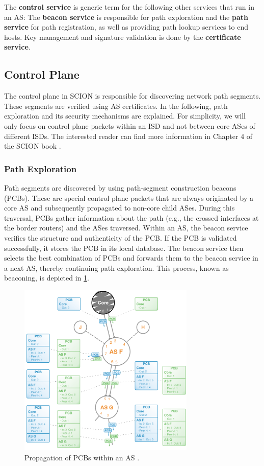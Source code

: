 The \textbf{control service} is generic term for the following other services that run in an AS:
The \textbf{beacon service} is responsible for path exploration and the \textbf{path service} for path registration, as well as providing path lookup services to end hosts.
Key management and signature validation is done by the \textbf{certificate service}.


\subsection{Control Plane}
\label{sec:control_plane}

The control plane in SCION is responsible for discovering network path segments.
These segments are verified using AS certificates.
In the following, path exploration and its security mechanisms are explained.
For simplicity, we will only focus on control plane packets within an ISD and not between core ASes of different ISDs.
The interested reader can find more information in Chapter 4 of the SCION book \cite{Perrig2022}.

\subsubsection{Path Exploration}
Path segments are discovered by using path-segment construction beacons (PCBs).
These are special control plane packets that are always originated by a core AS and subsequently propagated to non-core child ASes.
During this traversal, PCBs gather information about the path (e.g., the crossed interfaces at the border routers) and the ASes traversed.
Within an AS, the beacon service verifies the structure and authenticity of the PCB.
If the PCB is validated successfully, it stores the PCB in its local database.
The beacon service then selects the best combination of PCBs and forwards them to the beacon service in a next AS, thereby continuing path exploration.
This process, known as beaconing, is depicted in \cref{fig:scion_path_exploration}.

\begin{figure}[h]
    \centering
    \includegraphics[width=0.75\textwidth]{figures/scion_beacon.png}
    \caption{Propagation of PCBs within an AS \cite[Section 2.3.1]{Perrig2022}.}
    \label{fig:scion_path_exploration}
\end{figure}

